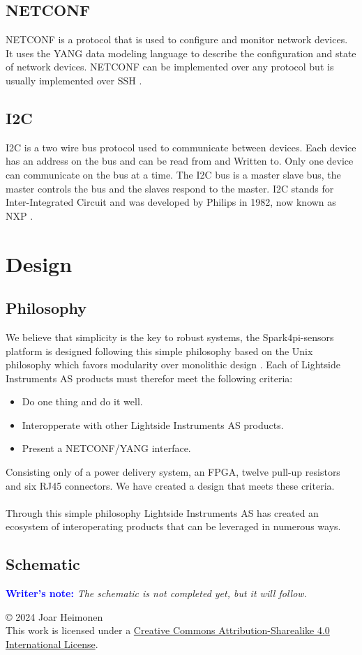 \documentclass[12pt]{article}
\newcommand{\writersnote}[1]{\textbf{\textcolor{blue}{Writer's note:}} \textit{#1}}
\newcommand{\license}{
    \vspace{1em}
    \noindent\small{© 2024 Joar Heimonen\\
    This work is licensed under a \href{https://creativecommons.org/licenses/by-sa/4.0/}{Creative Commons Attribution-Sharealike 4.0 International License}.}
    \vspace{1em}
}
\begin{document}
\subsection{NETCONF}
NETCONF is a protocol that is used to configure and monitor network devices. It uses the YANG data modeling language to describe the configuration and state of network devices.
NETCONF can be implemented over any protocol but is usually implemented over SSH \cite{ennsNetworkConfigurationProtocol2011}.

\subsection{I2C}
I2C is a two wire bus protocol used to communicate between devices. Each device has an address on the bus and can be read from and Written to.
Only one device can communicate on the bus at a time. The I2C bus is a master slave bus, the master controls the bus and the slaves respond to the master.
I2C stands for Inter-Integrated Circuit and was developed by Philips in 1982, now known as NXP \cite{I2CbusSpecificationUser2021}.

\section{Design}
\subsection{Philosophy}
We believe that simplicity is the key to robust systems, the Spark4pi-sensors platform is designed following this simple philosophy based on the 
Unix philosophy which favors modularity over monolithic design \cite{BasicsUnixPhilosophy}.
Each of Lightside Instruments AS products must therefor meet the following criteria:
\begin{itemize}
    \item Do one thing and do it well.
    \item Interopperate with other Lightside Instruments AS products.
    \item Present a NETCONF/YANG interface.
\end{itemize}
Consisting only of a power delivery system, an FPGA, twelve pull-up resistors and six RJ45 connectors. We have 
created a design that meets these criteria.
\\
\\
Through this simple philosophy Lightside Instruments AS has created an ecosystem of interoperating products that can be
leveraged in numerous ways.

\subsection{Schematic}
\writersnote{The schematic is not completed yet, but it will follow.}



\pagebreak
{}
\printbibliography
\license
\end{document}

